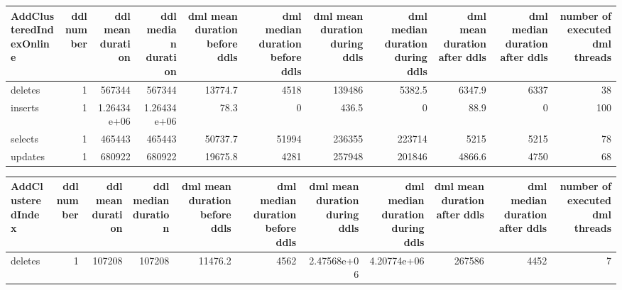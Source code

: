 \begin{tabular}{lrrrrrrrrrr}
\hline
 AddClusteredIndexOnline   &   ddl number &   ddl mean duration &   ddl median duration &   dml mean duration before ddls &   dml median duration before ddls &   dml mean duration during ddls &   dml median duration during ddls &   dml mean duration after ddls &   dml median duration after ddls &   number of executed dml threads \\
\hline
 deletes                   &            1 &    567344           &      567344           &                         13774.7 &                              4518 &                        139486   &                            5382.5 &                         6347.9 &                             6337 &                               38 \\
 inserts                   &            1 &         1.26434e+06 &           1.26434e+06 &                            78.3 &                                 0 &                           436.5 &                               0   &                           88.9 &                                0 &                              100 \\
 selects                   &            1 &    465443           &      465443           &                         50737.7 &                             51994 &                        236355   &                          223714   &                         5215   &                             5215 &                               78 \\
 updates                   &            1 &    680922           &      680922           &                         19675.8 &                              4281 &                        257948   &                          201846   &                         4866.6 &                             4750 &                               68 \\
\hline
\end{tabular}\begin{tabular}{lrrrrrrrrrr}
\hline
 AddClusteredIndex   &   ddl number &   ddl mean duration &   ddl median duration &   dml mean duration before ddls &   dml median duration before ddls &   dml mean duration during ddls &   dml median duration during ddls &   dml mean duration after ddls &   dml median duration after ddls &   number of executed dml threads \\
\hline
 deletes             &            1 &              107208 &                107208 &                         11476.2 &                            4562   &                     2.47568e+06 &                       4.20774e+06 &               267586           &                             4452 &                                7 \\

\end{tabular}
